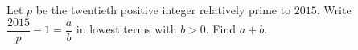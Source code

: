 Let $p$ be the twentieth positive integer relatively prime to $2015$. Write $\dfrac{2015}{p}-1=\dfrac{a}{b}$ in lowest terms with $b>0$. Find $a+b$.
